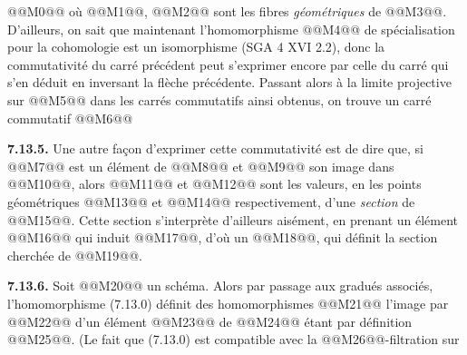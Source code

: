 
@@M0@@
où @@M1@@, @@M2@@
sont les fibres \emph{géométriques} de @@M3@@. D'ailleurs, on sait que maintenant l'homomorphisme @@M4@@ de spécialisation pour la cohomologie est un isomorphisme (SGA 4 XVI 2.2), donc la commutativité du carré précédent peut s'exprimer encore par celle du carré qui s'en déduit en inversant la flèche précédente. Passant alors à la limite projective sur @@M5@@ dans les carrés commutatifs ainsi obtenus, on trouve un carré commutatif
@@M6@@

\textbf{7.13.5.} Une autre façon d'exprimer cette commutativité est de dire que, si @@M7@@ est un élément de @@M8@@ et @@M9@@ son image dans @@M10@@, alors @@M11@@ et @@M12@@ sont les valeurs, en les points géométriques @@M13@@ et @@M14@@ respectivement, d'une \emph{section} de @@M15@@. Cette section s'interprète d'ailleurs aisément, en prenant un élément @@M16@@ qui induit @@M17@@, d'où un @@M18@@, qui définit la section cherchée de @@M19@@.

\textbf{7.13.6.} Soit @@M20@@ un schéma. Alors par passage aux gradués associés, l'homomorphisme (7.13.0) définit des homomorphismes
@@M21@@
l'image par @@M22@@ d'un élément @@M23@@ de @@M24@@ étant par définition @@M25@@. (Le fait que (7.13.0) est compatible avec la @@M26@@-filtration sur 
